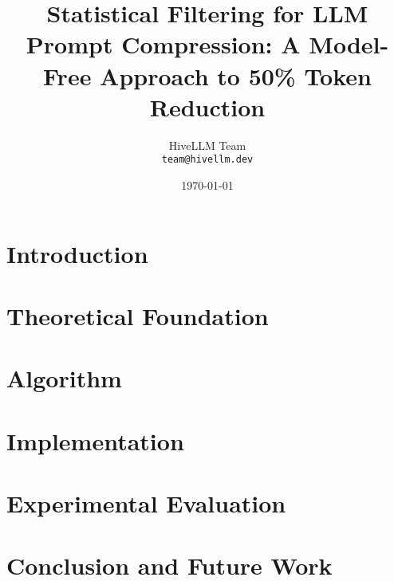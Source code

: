 \documentclass{article}
\title{Statistical Filtering for LLM Prompt Compression: A Model-Free Approach to 50\% Token Reduction}
\author{
  HiveLLM Team \\
  \texttt{team@hivellm.dev}
}
\date{\today}
\begin{document}
\maketitle

\begin{abstract}

\end{abstract}

\section{Introduction}


\section{Theoretical Foundation}


\section{Algorithm}


\section{Implementation}


\section{Experimental Evaluation}


\section{Conclusion and Future Work}




\end{document}

